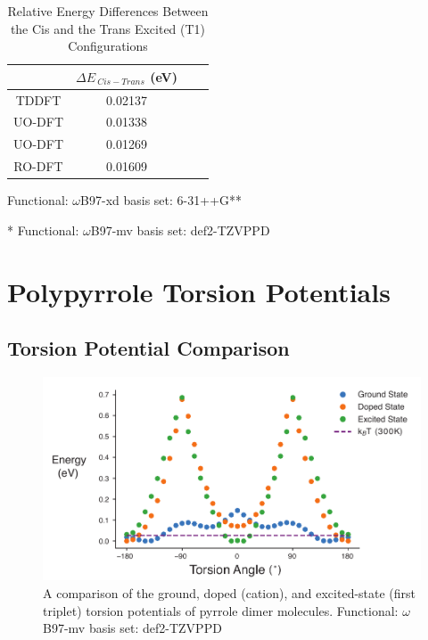 \begin{table}[hbt!]\centering
\captionsetup{justification=centering}
\captionsetup{width=.6\textwidth}
\captionsetup{skip=2pt}
\caption{Relative Energy Differences Between the Cis and the Trans Excited (T1) Configurations}
\label{tab:ex_ct_gap}
\renewcommand{\arraystretch}{1.5}
\begin{threeparttable}
\begin{tabular}{cccc}\toprule
\multicolumn{1}{c}{\multirow{1}{3.5cm}{\centering }} &
\multicolumn{1}{c}{\multirow{1}{3.5cm}{\centering $\Delta E_{\ Cis - Trans}$ (eV)}} \\ \midrule
    TDDFT\tnote{\textdagger} & 0.02137\\
    UO-DFT\tnote{\textdagger} & 0.01338\\
    UO-DFT\tnote{*} & 0.01269\\
    RO-DFT\tnote{*} & 0.01609\\ \bottomrule
\end{tabular}
\begin{tablenotes}
\item[\textdagger] \footnotesize Functional: $\omega$B97-xd basis set: 6-31++G**
\item[*] \footnotesize Functional: $\omega$B97-mv basis set: def2-TZVPPD
\end{tablenotes}
\end{threeparttable}
\end{table}

\section{Polypyrrole Torsion Potentials}
\label{sec:ppy}
\subsection{Torsion Potential Comparison}

\begin{figure}[hbt!]
    \centering
    \includegraphics{figures/append_tor_model/ppy_torsion_compare.pdf}
    \caption{A comparison of the ground, doped (cation), and excited-state (first triplet) torsion potentials of pyrrole dimer molecules. Functional: $\omega$B97-mv basis set: def2-TZVPPD}
    \label{fig:ppy_tor}
\end{figure}

